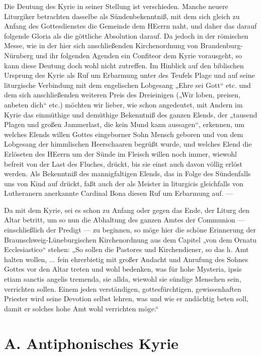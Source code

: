 Die Deutung des Kyrie in seiner Stellung ist verschieden. Manche neuere Liturgiker betrachten dasselbe als Sündenbekenntniß, mit dem sich gleich zu Anfang des Gottesdienstes die Gemeinde dem HEerrn naht, und daher das darauf folgende Gloria als die göttliche Absolution darauf. Da jedoch in der römischen Messe, wie in der hier sich anschließenden Kirchenordnung von Brandenburg-Nürnberg und ihr folgenden Agenden ein Confiteor dem Kyrie vorausgeht, so kann diese Deutung doch wohl nicht zutreffen. Im Hinblick auf den biblischen Ursprung des Kyrie als Ruf um Erbarmung unter
des Teufels Plage und auf seine liturgische Verbindung mit dem engelischen Lobgesang „Ehre sei Gott“ etc. und dem sich anschließenden weiteren Preis des Dreieinigen („Wir loben, preisen, anbeten dich“ etc.) möchten wir lieber, wie schon angedeutet, mit Andern im Kyrie das einmüthige und demüthige Bekenntniß des ganzen Elends, der „tausend Plagen und großen Jammerlast, die kein Mund kann aussagen“, erkennen, um welches Elends willen Gottes eingeborner Sohn Mensch geboren und von dem Lobgesang der himmlischen Heerschaaren begrüßt wurde, und welches Elend die Erlöseten des HEerrn um der Sünde im Fleisch willen noch immer, wiewohl befreit von der Last des Fluches, drückt, bis sie einst auch davon völlig erlöst werden. Als Bekenntniß des mannigfaltigen Elends, das in Folge des Sündenfalls uns von Kind auf drückt, faßt auch der als Meister in liturgicis gleichfalls von Lutheranern anerkannte Cardinal Bona diesen Ruf um Erbarmung auf. —

Da mit dem Kyrie, sei es schon zu Anfang oder gegen das Ende, der Liturg den Altar betritt, um so nun die Abhaltung des ganzen Amtes der Communion — einschließlich der Predigt — zu beginnen, so möge hier die schöne Erinnerung der Braunschweig-Lüneburgischen Kirchenordnung aus dem Capitel „von dem Ornatu Ecclesiastico“ stehen: „So sollen die Pastores und Kirchendiener, so das h. Amt halten wollen, ... fein ehrerbietig mit großer Andacht und Anrufung des Sohnes Gottes vor den Altar treten und wohl bedenken, was für hohe Mysteria, ipsis etiam sanctis angelis tremenda, sie allda, wiewohl sie sündige Menschen sein, verrichten sollen. Einem jeden verständigen, gottesfürchtigen, gewissenhaften Priester wird seine Devotion selbst lehren, was und wie er andächtig beten soll, damit er solches hohe Amt wohl verrichten möge.“

\section{A. Antiphonisches Kyrie}

